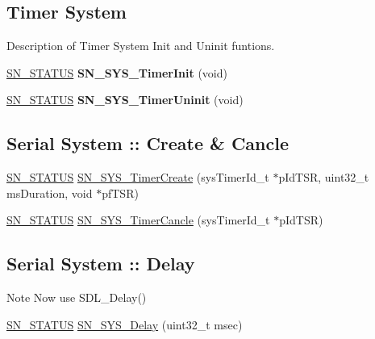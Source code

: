 \subsection*{Timer System}
\label{_amgrp97bcb014781015db18e3a1289035b4bb}%
Description of Timer System Init and Uninit funtions. \begin{DoxyCompactItemize}
\item 
\mbox{\label{group__SYSTEM__TIMER_gabe15a62b1e228b796d3a2297c085c9ef}} 
\hyperlink{group__SYSTEM__ERROR_ga4540713b9a7a18ce44d78c3a10f7442f}{S\+N\+\_\+\+S\+T\+A\+T\+US} {\bfseries S\+N\+\_\+\+S\+Y\+S\+\_\+\+Timer\+Init} (void)
\item 
\mbox{\label{group__SYSTEM__TIMER_gab533b949aff8c325d7e738f7c5bb1867}} 
\hyperlink{group__SYSTEM__ERROR_ga4540713b9a7a18ce44d78c3a10f7442f}{S\+N\+\_\+\+S\+T\+A\+T\+US} {\bfseries S\+N\+\_\+\+S\+Y\+S\+\_\+\+Timer\+Uninit} (void)
\end{DoxyCompactItemize}
\subsection*{Serial System \+:\+: Create \& Cancle}
\begin{DoxyCompactItemize}
\item 
\hyperlink{group__SYSTEM__ERROR_ga4540713b9a7a18ce44d78c3a10f7442f}{S\+N\+\_\+\+S\+T\+A\+T\+US} \hyperlink{group__SYSTEM__TIMER_ga0ee35ae172fdb2773d1a4fb1bcdf09bd}{S\+N\+\_\+\+S\+Y\+S\+\_\+\+Timer\+Create} (sys\+Timer\+Id\+\_\+t $\ast$p\+Id\+T\+SR, uint32\+\_\+t ms\+Duration, void $\ast$pf\+T\+SR)
\item 
\hyperlink{group__SYSTEM__ERROR_ga4540713b9a7a18ce44d78c3a10f7442f}{S\+N\+\_\+\+S\+T\+A\+T\+US} \hyperlink{group__SYSTEM__TIMER_gaa004347fdd0940a882a77729feaf60c4}{S\+N\+\_\+\+S\+Y\+S\+\_\+\+Timer\+Cancle} (sys\+Timer\+Id\+\_\+t $\ast$p\+Id\+T\+SR)
\end{DoxyCompactItemize}
\subsection*{Serial System \+:\+: Delay}
\label{_amgrp936e32d7756ef74700ad1497336bc3be}%
\begin{DoxyNote}{Note}
Now use S\+D\+L\+\_\+\+Delay() 
\end{DoxyNote}
\begin{DoxyCompactItemize}
\item 
\hyperlink{group__SYSTEM__ERROR_ga4540713b9a7a18ce44d78c3a10f7442f}{S\+N\+\_\+\+S\+T\+A\+T\+US} \hyperlink{group__SYSTEM__TIMER_ga4cf64b0280d940416955ba171ed339aa}{S\+N\+\_\+\+S\+Y\+S\+\_\+\+Delay} (uint32\+\_\+t msec)
\end{DoxyCompactItemize}


